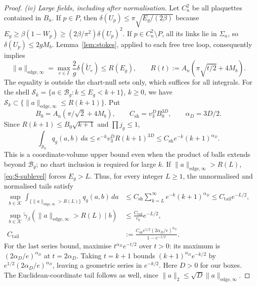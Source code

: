 \documentclass[11pt,a4paper]{article}
\theoremstyle{plain}
\theoremstyle{definition}
\theoremstyle{remark}
\numberwithin{equation}{section}
\begin{document}
\begin{proof}
\emph{(iv) Large fields, including after normalisation.}
Let $C_n^2$ be all plaquettes contained in $B_n$. If $p\in P$, then
$\delta(U_p)\le\pi\sqrt{E_g/(2\beta)}$ because $E_g\ge\beta(1-W_p)\ge(2\beta/\pi^2)\delta(U_p)^2$.
If $p\in C_n^2\setminus P$, all its links lie in $\Sigma_n$, so $\delta(U_p)\le2gM_b$.
Lemma~\ref{lem:stokes}, applied to each free tree loop, consequently implies
\begin{equation*}\tag{S.5}\label{eq:S-sublevel}
\|a\|_{\mathrm{edge},\infty}
=\max_{e\in I}\frac2g\delta(\widetilde U_e)
\le R(E_g),\qquad R(t):=A_n\left(\pi\sqrt{t/2}+4M_b\right).
\end{equation*}
The equality is outside the chart-null sets only, which suffices for all integrals.
For the shell $\mathcal S_k=\{a\in\mathcal B_g:k\le E_g<k+1\}$, $k\ge0$, we have
$\mathcal S_k\subset\{\|a\|_{\mathrm{edge},\infty}\le R(k+1)\}$.
Put
\[
B_0=A_n(\pi/\sqrt2+4M_b),\qquad
C_{\mathrm{sh}}=v_3^D B_0^{3D},\qquad \alpha_D=3D/2.
\]
Since $R(k+1)\le B_0\sqrt{k+1}$ and $\prod j_g\le1$,
\[
\int_{\mathcal S_k}q_g(a,b)\,da
\le e^{-k}v_3^D R(k+1)^{3D}
\le C_{\mathrm{sh}}e^{-k}(k+1)^{\alpha_D}.
\]
This is a coordinate-volume upper bound even when the product of balls extends beyond $\mathcal B_g$; no chart inclusion is
required for large $k$. If $\|a\|_{\mathrm{edge},\infty}>R(L)$, \eqref{eq:S-sublevel} forces $E_g>L$.
Thus, for every integer $L\ge1$, the unnormalised and normalised tails satisfy
\begin{equation*}\tag{S.6}\label{eq:S-tail}
\begin{split}
\sup_{b\in\mathcal K}\int_{\{\|a\|_{\mathrm{edge},\infty}>R(L)\}}q_g(a,b)\,da
 &\le C_{\mathrm{sh}}\sum_{k=L}^\infty e^{-k}(k+1)^{\alpha_D}
 \le C_{\mathrm{tail}}e^{-L/2},\\
\sup_{b\in\mathcal K}\tilde\gamma_\beta(\|a\|_{\mathrm{edge},\infty}>R(L)\mid b)
 &\le\frac{C_{\mathrm{tail}}}{c_0}e^{-L/2},\\
C_{\mathrm{tail}}
 &:=\frac{C_{\mathrm{sh}}e^{1/2}(2\alpha_D/e)^{\alpha_D}}{1-e^{-1/2}}.
\end{split}
\end{equation*}
For the last series bound, maximise $t^{\alpha_D}e^{-t/2}$ over $t>0$: its maximum is
$(2\alpha_D/e)^{\alpha_D}$ at $t=2\alpha_D$. Taking $t=k+1$ bounds
$(k+1)^{\alpha_D}e^{-k/2}$ by $e^{1/2}(2\alpha_D/e)^{\alpha_D}$, leaving a geometric series in $e^{-k/2}$.
Here $D>0$ for our boxes. The Euclidean-coordinate tail follows as well, since
$\|a\|_2\le\sqrt D\|a\|_{\mathrm{edge},\infty}$.


\end{proof}
\end{document}
